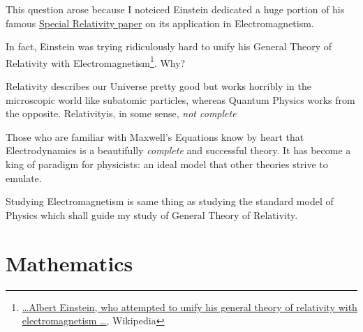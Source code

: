     \begin{tcolorbox}[
        parbox=false,
        enhanced,
        colback=green!5!white,
        colframe=green!75!black,
        colbacktitle=green!85!black,
        title={Why study Electromagnetism?},
        watermark graphics=砂糖-3.png,
        watermark opacity=0.3
    ]
        This question arose because I noteiced Einstein dedicated a huge portion of his famous
        \hyperlink{sr-original-paper}{Special Relativity paper} on its application in Electromagnetism.

        In fact, Einstein was trying ridiculously hard to unify his General Theory of Relativity with
        Electromagnetism\footnote{\href{https://en.wikipedia.org/wiki/Unified_field_theory}{\ldots Albert Einstein, who attempted to unify his general theory of relativity with electromagnetism \ldots}, Wikipedia}. Why?

        Relativity describes our Universe pretty good but works horribly in the microscopic world like subatomic
        particles, whereas Quantum Physics works from the opposite. Relativityis, in some sense, \textit{not complete}

        Those who are familiar with Maxwell's Equations know by heart that Electrodynamics is a beautifully
        \textit{complete} and successful theory. It has become a king of paradigm for physicists: an ideal model that
        other theories strive to emulate.

        Studying Electromagnetism is same thing as studying the standard model of Physics which shall guide my study of
        General Theory of Relativity.
    \end{tcolorbox}

    \chapter{Mathematics}
    

